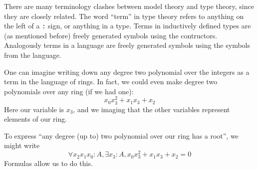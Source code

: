 \begin{rmk}
  There are many terminology clashes between model theory and type theory,
  since they are closely related.
  The word ``term'' in type theory refers to anything on the left of a \texttt{:} sign,
  or anything in a type.
  Terms in inductively defined types are (as mentioned before)
  freely generated symbols using the contructors.
  Analogously terms in a language are freely generated symbols using
  the symbols from the language.
\end{rmk}

One can imagine writing down any degree two polynomial over the integers
as a term in the language of rings.
In fact, we could even make degree two polynomials over any ring (if we had one):
\[ x_{0} x_{3}^{2} + x_{1} x_{3} + x_{2} \]
Here our variable is $x_{3}$, and we imaging that the other variables represent
elements of our ring.

To express ``any degree (up to) two polynomial over our ring has a root'',
we might write
\[ \forall x_{2} x_{1} x_{0} : A, \exists x_{3} : A, x_{0} x_{3}^{2} + x_{1} x_{3} + x_{2} = 0 \]
Formulas allow us to do this.

